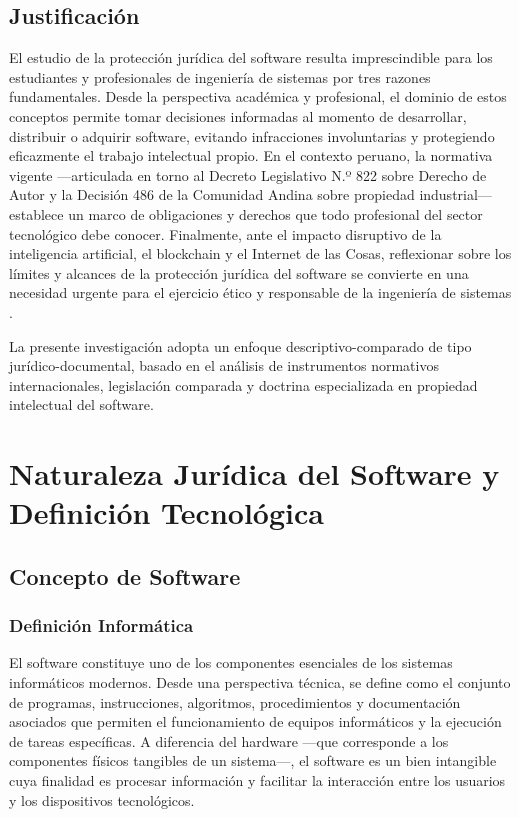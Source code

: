 \documentclass[11pt,a4paper]{report}
\begin{document}
\section*{Justificación}

El estudio de la protección jurídica del software resulta imprescindible para los estudiantes y profesionales de ingeniería de sistemas por tres razones fundamentales. Desde la perspectiva académica y profesional, el dominio de estos conceptos permite tomar decisiones informadas al momento de desarrollar, distribuir o adquirir software, evitando infracciones involuntarias y protegiendo eficazmente el trabajo intelectual propio. En el contexto peruano, la normativa vigente —articulada en torno al Decreto Legislativo N.º 822 sobre Derecho de Autor y la Decisión 486 de la Comunidad Andina sobre propiedad industrial— establece un marco de obligaciones y derechos que todo profesional del sector tecnológico debe conocer. Finalmente, ante el impacto disruptivo de la inteligencia artificial, el blockchain y el Internet de las Cosas, reflexionar sobre los límites y alcances de la protección jurídica del software se convierte en una necesidad urgente para el ejercicio ético y responsable de la ingeniería de sistemas \citep{euipo2022, indecopi2023}.

La presente investigación adopta un enfoque descriptivo-comparado de tipo jurídico-documental, basado en el análisis de instrumentos normativos internacionales, legislación comparada y doctrina especializada en propiedad intelectual del software.

\newpage

\chapter{Naturaleza Jurídica del Software y Definición Tecnológica}

\section{Concepto de Software}

\subsection{Definición Informática}

El software constituye uno de los componentes esenciales de los sistemas informáticos modernos. Desde una perspectiva técnica, se define como el conjunto de programas, instrucciones, algoritmos, procedimientos y documentación asociados que permiten el funcionamiento de equipos informáticos y la ejecución de tareas específicas. A diferencia del hardware —que corresponde a los componentes físicos tangibles de un sistema—, el software es un bien intangible cuya finalidad es procesar información y facilitar la interacción entre los usuarios y los dispositivos tecnológicos.
\end{document}
